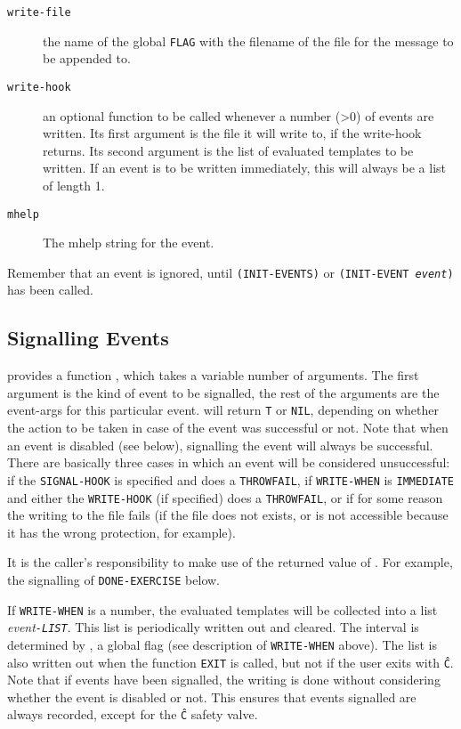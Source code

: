 \begin{description}
\item[{\tt write-file} ]	  the name of the global {\tt FLAG} with the filename of the
     file for the message to be appended to.

\item[{\tt write-hook} ]	  an optional function to be called whenever a number
	(>0) of events are written.  Its first argument is the file it will
        write to, if the write-hook returns.  Its second argument is the
        list of evaluated templates to be written.  If an event is to be
        written immediately, this will always be a list of length 1.

\item[{\tt mhelp} ]	  The mhelp string for the event.
\end{description}

Remember that an event is ignored, until {\tt (INIT-EVENTS)} or {\tt (INIT-EVENT
{\it event})} has been called.

\subsection{Signalling Events}

{\TPS} provides a function , which takes a variable number
of arguments.  The first argument is the kind of event to be signalled,
the rest of the arguments are the event-args for this particular event.
 will return {\tt T} or {\tt NIL}, depending on whether the action
to be taken in case of the event was successful or not.  Note that when
an event is disabled (see below), signalling the event will always be
successful.  There are basically three cases in which an event will be
considered unsuccessful: if the {\tt SIGNAL-HOOK} is specified and does a
{\tt THROWFAIL}, if {\tt WRITE-WHEN} is {\tt IMMEDIATE} and either the {\tt WRITE-HOOK}
(if specified) does a {\tt THROWFAIL}, or if for some reason the writing to
the file fails (if the file does not exists, or is not accessible
because it has the wrong protection, for example).

It is the caller's responsibility to make use of the returned value of
.  For example, the signalling of {\tt DONE-EXERCISE} below.

If {\tt WRITE-WHEN} is a number, the evaluated templates will be collected
into a list {\it event{\tt -LIST}}.  This list is periodically written out and
cleared.  The interval is determined by , a global flag
(see description of {\tt WRITE-WHEN} above).  The list is also written out
when the function {\tt EXIT} is called, but not if the user exits {\TPS} with
{\tt \^C}.  Note that if events have been signalled, the writing is done
without considering whether the event is disabled or not.  This ensures
that events signalled are always recorded, except for the {\tt \^C} safety valve.


